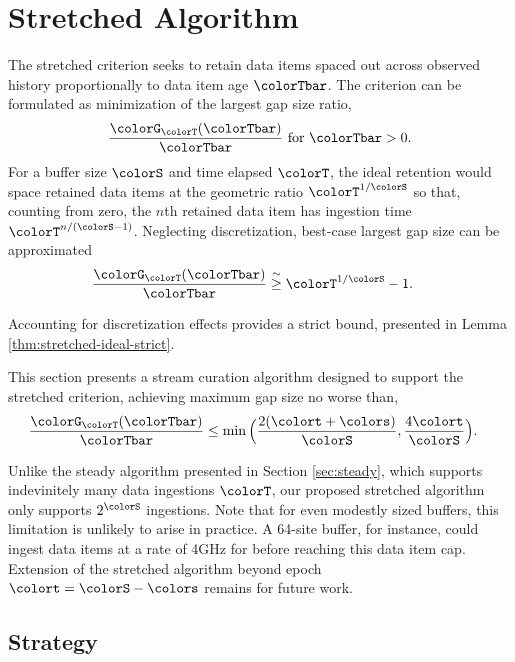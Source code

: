 \section{Stretched Algorithm} \label{sec:stretched}




The stretched criterion seeks to retain data items spaced out across observed history proportionally to data item age $\colorTbar$.
The criterion can be formulated as minimization of the largest gap size ratio,
\begin{align*}
\frac{\colorG_{\colorT}(\colorTbar)}{\colorTbar} \text{ for } \colorTbar > 0.
\end{align*}
For a buffer size $\colorS$ and time elapsed $\colorT$, the ideal retention would space retained data items at the geometric ratio $\colorT^{1/\colorS}$ so that, counting from zero, the $n$th retained data item has ingestion time $\colorT^{n/(\colorS - 1)}$.
Neglecting discretization, best-case largest gap size can be approximated
\begin{align*}
\frac{\colorG_{\colorT}(\colorTbar)}{\colorTbar}
&\stackrel{\sim}{\geq}
\colorT^{1/\colorS} - 1.
\end{align*}

Accounting for discretization effects provides a strict bound, presented in Lemma \ref{thm:stretched-ideal-strict}.



This section presents a stream curation algorithm designed to support the stretched criterion, achieving maximum gap size no worse than,
\begin{align*}
\frac{\colorG_{\colorT}(\colorTbar)}{\colorTbar}
&\leq
\min\Big(
  \frac{2(\colort + \colors)}{\colorS},
  \frac{4\colort}{\colorS}
\Big).
\end{align*}

Unlike the steady algorithm presented in Section \ref{sec:steady}, which supports indevinitely many data ingestions $\colorT$, our proposed stretched algorithm only supports $2^{\colorS}$ ingestions.
Note that for even modestly sized buffers, this limitation is unlikely to arise in practice.
A 64-site buffer, for instance, could ingest data items at a rate of 4GHz for before reaching this data item cap.
Extension of the stretched algorithm beyond epoch $\colort = \colorS - \colors$ remains for future work.

\subsection{Strategy}

